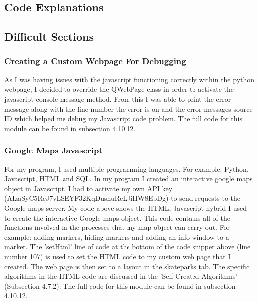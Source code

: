 \begin{landscape}
\section{Code Explanations}

\subsection{Difficult Sections}

\subsubsection{Creating a Custom Webpage For Debugging}


As I was having issues with the javascript functioning correctly within the python webpage, I decided to override the QWebPage class in order to activate the javascript console message method. From this I was able to print the error message along with the line number the error is on and the error messages source ID which helped me debug my Javascript code problem. The full code for this module can be found in subsection 4.10.12.

\subsubsection{Google Maps Javascript}

For my program, I used multiple programming languages. For example: Python, Javascript, HTML and SQL. In my program I created an interactive google maps object in Javascript. I had to activate my own API key (AIzaSyC5RcJ7vLSEYF32KqDusnuRcLJiHW8EbDg) to send requests to the Google maps server. My code above shows the HTML, Javascript hybrid I used to create the interactive Google maps object. This code contains all of the functions involved in the processes that my map object can carry out. For example: adding markers, hiding markers and adding an info window to a marker. The 'setHtml' line of code at the bottom of the code snipper above (line number 107) is used to set the HTML code to my custom web page that I created. The web page is then set to a layout in the skateparks tab. The specific algorithms in the HTML code are discussed in the 'Self-Created Algorithms' (Subsection 4.7.2). The full code for this module can be found in subsection 4.10.12.




\end{landscape}
